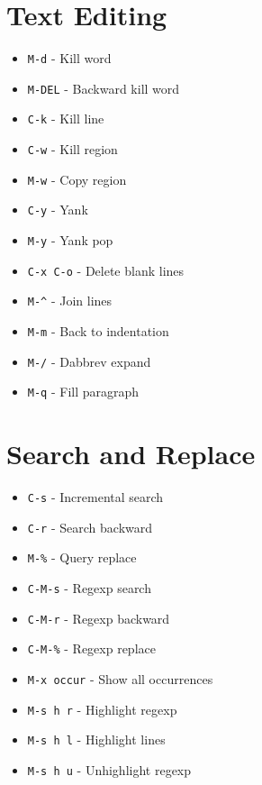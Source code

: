 \documentclass[6pt,landscape]{article}
\newcommand{\key}[1]{\texttt{#1}}
\begin{document}
\begin{multicols*}{5}
\section*{Text Editing}
\begin{itemize}[leftmargin=*,itemsep=0pt,parsep=0pt,topsep=0pt]
\item \key{M-d} - Kill word
\item \key{M-DEL} - Backward kill word
\item \key{C-k} - Kill line
\item \key{C-w} - Kill region
\item \key{M-w} - Copy region
\item \key{C-y} - Yank
\item \key{M-y} - Yank pop
\item \key{C-x C-o} - Delete blank lines
\item \key{M-\textasciicircum} - Join lines
\item \key{M-m} - Back to indentation
\item \key{M-/} - Dabbrev expand
\item \key{M-q} - Fill paragraph
\end{itemize}

\section*{Search and Replace}
\begin{itemize}[leftmargin=*,itemsep=0pt,parsep=0pt,topsep=0pt]
\item \key{C-s} - Incremental search
\item \key{C-r} - Search backward
\item \key{M-\%} - Query replace
\item \key{C-M-s} - Regexp search
\item \key{C-M-r} - Regexp backward
\item \key{C-M-\%} - Regexp replace
\item \key{M-x occur} - Show all occurrences
\item \key{M-s h r} - Highlight regexp
\item \key{M-s h l} - Highlight lines
\item \key{M-s h u} - Unhighlight regexp
\end{itemize}


\end{multicols*}
\end{document}
